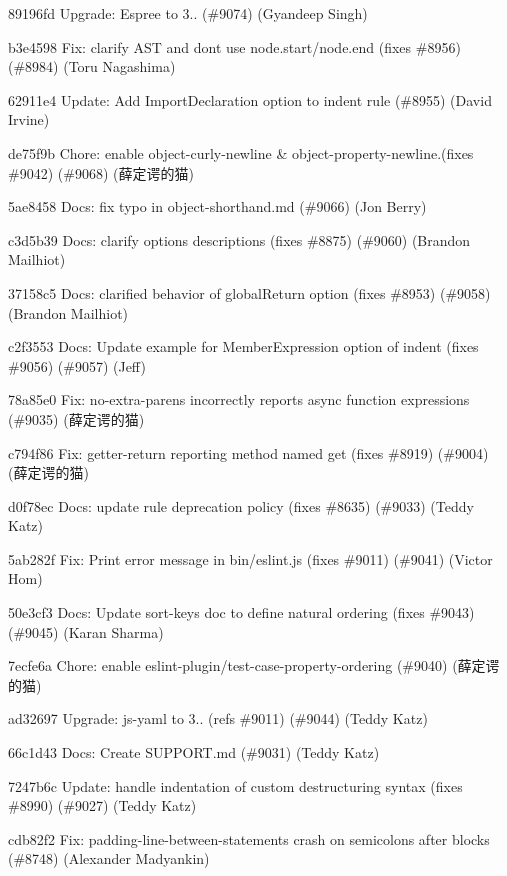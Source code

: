 \begin{DoxyItemize}
\item 89196fd Upgrade\+: Espree to 3.. (\#9074) (Gyandeep Singh)
\item b3e4598 Fix\+: clarify A\+ST and don\textquotesingle{}t use {\ttfamily node.\+start}/{\ttfamily node.\+end} (fixes \#8956) (\#8984) (Toru Nagashima)
\item 62911e4 Update\+: Add Import\+Declaration option to indent rule (\#8955) (David Irvine)
\item de75f9b Chore\+: enable object-\/curly-\/newline \& object-\/property-\/newline.(fixes \#9042) (\#9068) (薛定谔的猫)
\item 5ae8458 Docs\+: fix typo in object-\/shorthand.\+md (\#9066) (Jon Berry)
\item c3d5b39 Docs\+: clarify options descriptions (fixes \#8875) (\#9060) (Brandon Mailhiot)
\item 37158c5 Docs\+: clarified behavior of global\+Return option (fixes \#8953) (\#9058) (Brandon Mailhiot)
\item c2f3553 Docs\+: Update example for Member\+Expression option of indent (fixes \#9056) (\#9057) (Jeff)
\item 78a85e0 Fix\+: no-\/extra-\/parens incorrectly reports async function expressions (\#9035) (薛定谔的猫)
\item c794f86 Fix\+: getter-\/return reporting method named \textquotesingle{}get\textquotesingle{} (fixes \#8919) (\#9004) (薛定谔的猫)
\item d0f78ec Docs\+: update rule deprecation policy (fixes \#8635) (\#9033) (Teddy Katz)
\item 5ab282f Fix\+: Print error message in bin/eslint.\+js (fixes \#9011) (\#9041) (Victor Hom)
\item 50e3cf3 Docs\+: Update sort-\/keys doc to define natural ordering (fixes \#9043) (\#9045) (Karan Sharma)
\item 7ecfe6a Chore\+: enable eslint-\/plugin/test-\/case-\/property-\/ordering (\#9040) (薛定谔的猫)
\item ad32697 Upgrade\+: js-\/yaml to 3.. (refs \#9011) (\#9044) (Teddy Katz)
\item 66c1d43 Docs\+: Create S\+U\+P\+P\+O\+R\+T.\+md (\#9031) (Teddy Katz)
\item 7247b6c Update\+: handle indentation of custom destructuring syntax (fixes \#8990) (\#9027) (Teddy Katz)
\item cdb82f2 Fix\+: padding-\/line-\/between-\/statements crash on semicolons after blocks (\#8748) (Alexander Madyankin)

\end{DoxyItemize}
